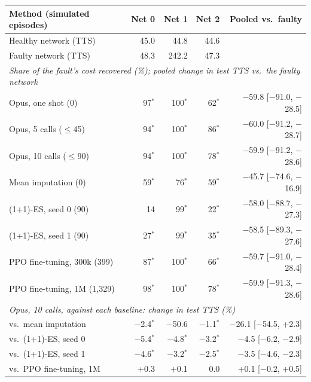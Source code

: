 \begin{tabular}{lrrrr}
\toprule
Method (simulated episodes) & Net 0 & Net 1 & Net 2 & Pooled vs.\ faulty \\
\midrule
Healthy network (TTS) & 45.0 & 44.8 & 44.6 & \\
Faulty network (TTS) & 48.3 & 242.2 & 47.3 & \\
\midrule
\multicolumn{5}{l}{\emph{Share of the fault's cost recovered (\%); pooled change in test TTS vs.\ the faulty network}} \\
\quad Opus, one shot (0) & 97$^{*}$ & 100$^{*}$ & 62$^{*}$ & $-$59.8 [$-$91.0, $-$28.5] \\
\quad Opus, 5 calls ($\le$45) & 94$^{*}$ & 100$^{*}$ & 86$^{*}$ & $-$60.0 [$-$91.2, $-$28.7] \\
\quad Opus, 10 calls ($\le$90) & 94$^{*}$ & 100$^{*}$ & 78$^{*}$ & $-$59.9 [$-$91.2, $-$28.6] \\
\quad Mean imputation (0) & 59$^{*}$ & 76$^{*}$ & 59$^{*}$ & $-$45.7 [$-$74.6, $-$16.9] \\
\quad (1+1)-ES, seed 0 (90) & 14 & 99$^{*}$ & 22$^{*}$ & $-$58.0 [$-$88.7, $-$27.3] \\
\quad (1+1)-ES, seed 1 (90) & 27$^{*}$ & 99$^{*}$ & 35$^{*}$ & $-$58.5 [$-$89.3, $-$27.6] \\
\quad PPO fine-tuning, 300k (399) & 87$^{*}$ & 100$^{*}$ & 66$^{*}$ & $-$59.7 [$-$91.0, $-$28.4] \\
\quad PPO fine-tuning, 1M (1{,}329) & 98$^{*}$ & 100$^{*}$ & 78$^{*}$ & $-$59.9 [$-$91.3, $-$28.6] \\
\midrule
\multicolumn{5}{l}{\emph{Opus, 10 calls, against each baseline: change in test TTS (\%)}} \\
\quad vs.\ mean imputation & $-$2.4$^{*}$ & $-$50.6 & $-$1.1$^{*}$ & $-$26.1 [$-$54.5, +2.3] \\
\quad vs.\ (1+1)-ES, seed 0 & $-$5.4$^{*}$ & $-$4.8$^{*}$ & $-$3.2$^{*}$ & $-$4.5 [$-$6.2, $-$2.9] \\
\quad vs.\ (1+1)-ES, seed 1 & $-$4.6$^{*}$ & $-$3.2$^{*}$ & $-$2.5$^{*}$ & $-$3.5 [$-$4.6, $-$2.3] \\
\quad vs.\ PPO fine-tuning, 1M & +0.3 & +0.1 & 0.0 & +0.1 [$-$0.2, +0.5] \\
\bottomrule
\end{tabular}
